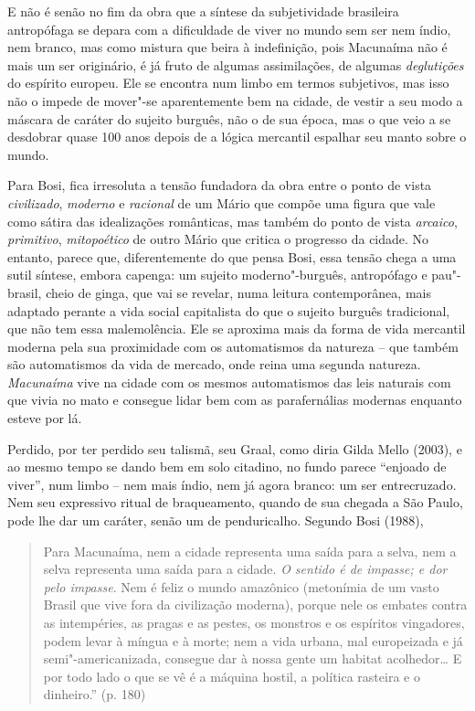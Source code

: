 E não é senão no fim da obra que a síntese da subjetividade brasileira
antropófaga se depara com a dificuldade de viver no mundo sem ser nem
índio, nem branco, mas como mistura que beira à indefinição, pois
Macunaíma não é mais um ser originário, é já fruto de algumas
assimilações, de algumas \emph{deglutições} do espírito europeu. Ele se
encontra num limbo em termos subjetivos, mas isso não o impede de
mover"-se aparentemente bem na cidade, de vestir a seu modo a máscara de
caráter do sujeito burguês, não o de sua época, mas o que veio a se
desdobrar quase 100 anos depois de a lógica mercantil espalhar seu manto
sobre o mundo.

Para Bosi, fica irresoluta a tensão fundadora da obra entre o ponto de
vista \emph{civilizado}, \emph{moderno} e \emph{racional} de um Mário
que compõe uma figura que vale como sátira das idealizações românticas,
mas também do ponto de vista \emph{arcaico}, \emph{primitivo},
\emph{mitopoético} de outro Mário que critica o progresso da cidade. No
entanto, parece que, diferentemente do que pensa Bosi, essa tensão chega
a uma sutil síntese, embora capenga: um sujeito moderno"-burguês,
antropófago e pau"-brasil, cheio de ginga, que vai se revelar, numa
leitura contemporânea, mais adaptado perante a vida social capitalista
do que o sujeito burguês tradicional, que não tem essa malemolência. Ele
se aproxima mais da forma de vida mercantil moderna pela sua proximidade
com os automatismos da natureza -- que também são automatismos da vida
de mercado, onde reina uma segunda natureza. \emph{Macunaíma} vive na
cidade com os mesmos automatismos das leis naturais com que vivia no
mato e consegue lidar bem com as parafernálias modernas enquanto esteve
por lá.

Perdido, por ter perdido seu talismã, seu Graal, como diria Gilda Mello
(2003), e ao mesmo tempo se dando bem em solo citadino, no fundo parece
``enjoado de viver'', num limbo -- nem mais índio, nem já agora branco:
um ser entrecruzado. Nem seu expressivo ritual de braqueamento, quando de sua
chegada a São Paulo, pode lhe dar um caráter, senão um de penduricalho.
Segundo Bosi (1988),

\begin{quote}
Para Macunaíma, nem a cidade representa uma saída para a selva, nem a
selva representa uma saída para a cidade. \emph{O sentido é de impasse;
e dor pelo impasse}. Nem é feliz o mundo amazônico (metonímia de um
vasto Brasil que vive fora da civilização moderna), porque nele os
embates contra as intempéries, as pragas e as pestes, os monstros e os
espíritos vingadores, podem levar à míngua e à morte; nem a vida urbana,
mal europeizada e já semi"-americanizada, consegue dar à nossa gente um
habitat acolhedor\ldots{} E por todo lado o que se vê é a máquina hostil, a
política rasteira e o dinheiro.'' (p. 180)
\end{quote}

